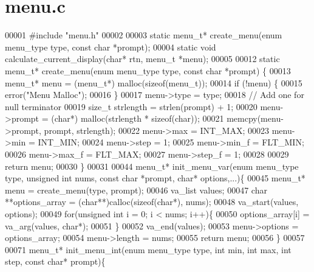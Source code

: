 \section{menu.\+c}
\label{menu_8c_source}

\begin{DoxyCode}
00001 \textcolor{preprocessor}{#include "menu.h"}
00002 
00003 \textcolor{keyword}{static} menu_t* create_menu(\textcolor{keyword}{enum} menu_type type, \textcolor{keyword}{const} \textcolor{keywordtype}{char} *prompt);
00004 \textcolor{keyword}{static} \textcolor{keywordtype}{void} calculate_current_display(\textcolor{keywordtype}{char}* rtn, menu_t *menu);
00005 
00012 \textcolor{keyword}{static} menu_t* create_menu(\textcolor{keyword}{enum} menu_type type, \textcolor{keyword}{const} \textcolor{keywordtype}{char} *prompt) \{
00013   menu_t* menu = (menu_t*) malloc(\textcolor{keyword}{sizeof}(menu_t));
00014   \textcolor{keywordflow}{if} (!menu) \{
00015     error(\textcolor{stringliteral}{"Menu Malloc"});
00016   \}
00017   menu->type = type;
00018   \textcolor{comment}{// Add one for null terminator}
00019   \textcolor{keywordtype}{size\_t} strlength = strlen(prompt) + 1;
00020   menu->prompt = (\textcolor{keywordtype}{char}*) malloc(strlength * \textcolor{keyword}{sizeof}(\textcolor{keywordtype}{char}));
00021   memcpy(menu->prompt, prompt, strlength);
00022   menu->max = INT\_MAX;
00023   menu->min = INT\_MIN;
00024   menu->step = 1;
00025   menu->min_f = FLT\_MIN;
00026   menu->max_f = FLT\_MAX;
00027   menu->step_f = 1;
00028 
00029   \textcolor{keywordflow}{return} menu;
00030 \}
00031 
00044 menu_t* init_menu_var(\textcolor{keyword}{enum} menu_type type, \textcolor{keywordtype}{unsigned} \textcolor{keywordtype}{int} nums, \textcolor{keyword}{const} \textcolor{keywordtype}{char} *prompt, \textcolor{keywordtype}{char}* options,...)\{
00045   menu_t* menu = create_menu(type, prompt);
00046   va\_list values;
00047   \textcolor{keywordtype}{char} **options\_array = (\textcolor{keywordtype}{char}**)calloc(\textcolor{keyword}{sizeof}(\textcolor{keywordtype}{char}*), nums);
00048   va\_start(values, options);
00049   \textcolor{keywordflow}{for}(\textcolor{keywordtype}{unsigned} \textcolor{keywordtype}{int} i = 0; i < nums; i++)\{
00050     options\_array[i] = va\_arg(values, \textcolor{keywordtype}{char}*);
00051   \}
00052   va\_end(values);
00053   menu->options = options\_array;
00054   menu->length = nums;
00055   \textcolor{keywordflow}{return} menu;
00056 \}
00057 
00071 menu_t* init_menu_int(\textcolor{keyword}{enum} menu_type type, \textcolor{keywordtype}{int} min, \textcolor{keywordtype}{int} max, \textcolor{keywordtype}{int} step, \textcolor{keyword}{const} \textcolor{keywordtype}{char}* prompt)\{

\end{DoxyCode}
